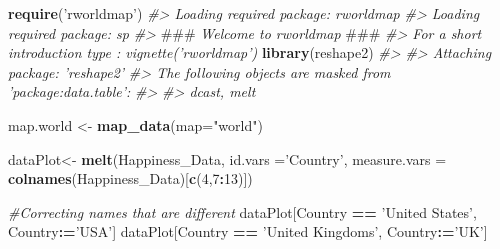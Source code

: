 \documentclass[]{book}
\newenvironment{Shaded}{\begin{snugshade}}{\end{snugshade}}
\newcommand{\AlertTok}[1]{\textcolor[rgb]{0.94,0.16,0.16}{#1}}
\newcommand{\CommentTok}[1]{\textcolor[rgb]{0.56,0.35,0.01}{\textit{#1}}}
\newcommand{\DataTypeTok}[1]{\textcolor[rgb]{0.13,0.29,0.53}{#1}}
\newcommand{\DecValTok}[1]{\textcolor[rgb]{0.00,0.00,0.81}{#1}}
\newcommand{\ErrorTok}[1]{\textcolor[rgb]{0.64,0.00,0.00}{\textbf{#1}}}
\newcommand{\KeywordTok}[1]{\textcolor[rgb]{0.13,0.29,0.53}{\textbf{#1}}}
\newcommand{\NormalTok}[1]{#1}
\newcommand{\OperatorTok}[1]{\textcolor[rgb]{0.81,0.36,0.00}{\textbf{#1}}}
\newcommand{\StringTok}[1]{\textcolor[rgb]{0.31,0.60,0.02}{#1}}
\begin{document}
\begin{Shaded}
\begin{Highlighting}[]
\KeywordTok{require}\NormalTok{(}\StringTok{'rworldmap'}\NormalTok{)}
\CommentTok{#> Loading required package: rworldmap}
\CommentTok{#> Loading required package: sp}
\CommentTok{#> }\AlertTok{###}\CommentTok{ Welcome to rworldmap }\AlertTok{###}
\CommentTok{#> For a short introduction type :   vignette('rworldmap')}
\KeywordTok{library}\NormalTok{(reshape2)}
\CommentTok{#> }
\CommentTok{#> Attaching package: 'reshape2'}
\CommentTok{#> The following objects are masked from 'package:data.table':}
\CommentTok{#> }
\CommentTok{#>     dcast, melt}

\NormalTok{map.world <-}\StringTok{ }\KeywordTok{map_data}\NormalTok{(}\DataTypeTok{map=}\StringTok{"world"}\NormalTok{)}

\NormalTok{dataPlot<-}\StringTok{ }\KeywordTok{melt}\NormalTok{(Happiness_Data, }\DataTypeTok{id.vars =}\StringTok{'Country'}\NormalTok{, }
                \DataTypeTok{measure.vars =} \KeywordTok{colnames}\NormalTok{(Happiness_Data)[}\KeywordTok{c}\NormalTok{(}\DecValTok{4}\NormalTok{,}\DecValTok{7}\OperatorTok{:}\DecValTok{13}\NormalTok{)])}

\CommentTok{#Correcting names that are different}
\NormalTok{dataPlot[Country }\OperatorTok{==}\StringTok{ 'United States'}\NormalTok{, Country}\OperatorTok{:}\ErrorTok{=}\StringTok{'USA'}\NormalTok{]}
\NormalTok{dataPlot[Country }\OperatorTok{==}\StringTok{ 'United Kingdoms'}\NormalTok{, Country}\OperatorTok{:}\ErrorTok{=}\StringTok{'UK'}\NormalTok{]}


\end{Highlighting}
\end{Shaded}
\end{document}
